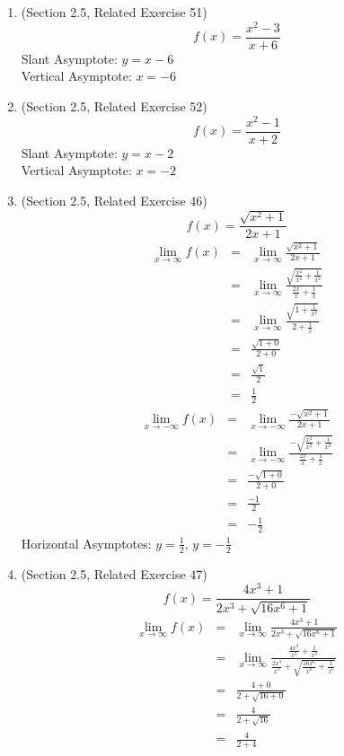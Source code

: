 \documentclass{article}
\begin{document}
\begin{enumerate}
	\item (Section 2.5, Related Exercise 51)
        $$f(x) = \frac{x^2 - 3}{x+6}$$
		Slant Asymptote: $y = x - 6$ \\
        Vertical Asymptote: $x = -6$
	\item (Section 2.5, Related Exercise 52)
		$$f(x) = \frac{x^2 - 1}{x + 2}$$
		Slant Asymptote: $y = x - 2$ \\
        Vertical Asymptote: $x = -2$
	\item (Section 2.5, Related Exercise 46)
        $$f(x) = \frac{\sqrt{x^2 + 1}}{2x+1}$$
        \begin{eqnarray}
            \lim_{x \to \infty}{f(x)} &=& \lim_{x \to \infty}{\frac{\sqrt{x^2 + 1}}{2x+1}} \\
			&=& \lim_{x \to \infty}{\frac{\sqrt{\frac{x^2}{x^2} + \frac{1}{x^2}}}{\frac{2x}{x}+\frac{1}{x}}} \\
			&=& \lim_{x \to \infty}{\frac{\sqrt{1 + \frac{1}{x^2}}}{2+\frac{1}{x}}} \\
			&=& \frac{\sqrt{1 + 0}}{2+0} \\
			&=& \frac{\sqrt{1}}{2} \\
			&=& \frac{1}{2}
        \end{eqnarray}
		\begin{eqnarray}
			\lim_{x \to - \infty}{f(x)} &=& \lim_{x \to - \infty}{\frac{- \sqrt{x^2 + 1}}{2x+1}} \\
			&=& \lim_{x \to - \infty}{\frac{- \sqrt{\frac{x^2}{x^2} + \frac{1}{x^2}}}{\frac{2x}{x}+\frac{1}{x}}} \\
			&=& \frac{- \sqrt{1 + 0}}{2+0} \\
			&=& \frac{- 1}{2} \\
			&=& - \frac{1}{2}
		\end{eqnarray}
		Horizontal Asymptotes: $y = \frac{1}{2}$, $y = - \frac{1}{2}$
	\item (Section 2.5, Related Exercise 47)
		$$f(x) = \frac{4x^3 + 1}{2x^3 + \sqrt{16x^6 + 1}}$$
		\begin{eqnarray}
			\lim_{x \to \infty}{f(x)} &=& \lim_{x \to \infty}{\frac{4x^3 + 1}{2x^3 + \sqrt{16x^6 + 1}}} \\
			&=& \lim_{x \to \infty}{\frac{\frac{4x^3}{x^3} + \frac{1}{x^3}}{\frac{2x^3}{x^3} + \sqrt{\frac{16x^6}{x^6} + \frac{1}{x^6}}}} \\
			&=& \frac{4 + 0}{2 + \sqrt{16 + 0}} \\
			&=& \frac{4}{2 + \sqrt{16}} \\
			&=& \frac{4}{2 + 4} \\

\end{eqnarray}
\end{enumerate}
\end{document}
